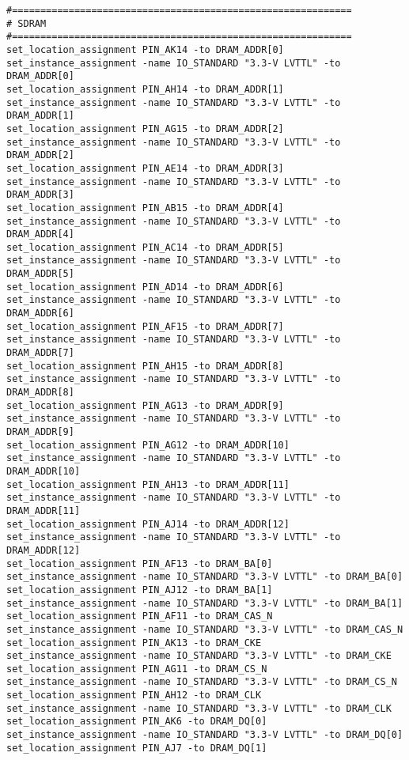 \begin{verbatim}
#============================================================
# SDRAM
#============================================================
set_location_assignment PIN_AK14 -to DRAM_ADDR[0]
set_instance_assignment -name IO_STANDARD "3.3-V LVTTL" -to DRAM_ADDR[0]
set_location_assignment PIN_AH14 -to DRAM_ADDR[1]
set_instance_assignment -name IO_STANDARD "3.3-V LVTTL" -to DRAM_ADDR[1]
set_location_assignment PIN_AG15 -to DRAM_ADDR[2]
set_instance_assignment -name IO_STANDARD "3.3-V LVTTL" -to DRAM_ADDR[2]
set_location_assignment PIN_AE14 -to DRAM_ADDR[3]
set_instance_assignment -name IO_STANDARD "3.3-V LVTTL" -to DRAM_ADDR[3]
set_location_assignment PIN_AB15 -to DRAM_ADDR[4]
set_instance_assignment -name IO_STANDARD "3.3-V LVTTL" -to DRAM_ADDR[4]
set_location_assignment PIN_AC14 -to DRAM_ADDR[5]
set_instance_assignment -name IO_STANDARD "3.3-V LVTTL" -to DRAM_ADDR[5]
set_location_assignment PIN_AD14 -to DRAM_ADDR[6]
set_instance_assignment -name IO_STANDARD "3.3-V LVTTL" -to DRAM_ADDR[6]
set_location_assignment PIN_AF15 -to DRAM_ADDR[7]
set_instance_assignment -name IO_STANDARD "3.3-V LVTTL" -to DRAM_ADDR[7]
set_location_assignment PIN_AH15 -to DRAM_ADDR[8]
set_instance_assignment -name IO_STANDARD "3.3-V LVTTL" -to DRAM_ADDR[8]
set_location_assignment PIN_AG13 -to DRAM_ADDR[9]
set_instance_assignment -name IO_STANDARD "3.3-V LVTTL" -to DRAM_ADDR[9]
set_location_assignment PIN_AG12 -to DRAM_ADDR[10]
set_instance_assignment -name IO_STANDARD "3.3-V LVTTL" -to DRAM_ADDR[10]
set_location_assignment PIN_AH13 -to DRAM_ADDR[11]
set_instance_assignment -name IO_STANDARD "3.3-V LVTTL" -to DRAM_ADDR[11]
set_location_assignment PIN_AJ14 -to DRAM_ADDR[12]
set_instance_assignment -name IO_STANDARD "3.3-V LVTTL" -to DRAM_ADDR[12]
set_location_assignment PIN_AF13 -to DRAM_BA[0]
set_instance_assignment -name IO_STANDARD "3.3-V LVTTL" -to DRAM_BA[0]
set_location_assignment PIN_AJ12 -to DRAM_BA[1]
set_instance_assignment -name IO_STANDARD "3.3-V LVTTL" -to DRAM_BA[1]
set_location_assignment PIN_AF11 -to DRAM_CAS_N
set_instance_assignment -name IO_STANDARD "3.3-V LVTTL" -to DRAM_CAS_N
set_location_assignment PIN_AK13 -to DRAM_CKE
set_instance_assignment -name IO_STANDARD "3.3-V LVTTL" -to DRAM_CKE
set_location_assignment PIN_AG11 -to DRAM_CS_N
set_instance_assignment -name IO_STANDARD "3.3-V LVTTL" -to DRAM_CS_N
set_location_assignment PIN_AH12 -to DRAM_CLK
set_instance_assignment -name IO_STANDARD "3.3-V LVTTL" -to DRAM_CLK
set_location_assignment PIN_AK6 -to DRAM_DQ[0]
set_instance_assignment -name IO_STANDARD "3.3-V LVTTL" -to DRAM_DQ[0]
set_location_assignment PIN_AJ7 -to DRAM_DQ[1]

\end{verbatim}
